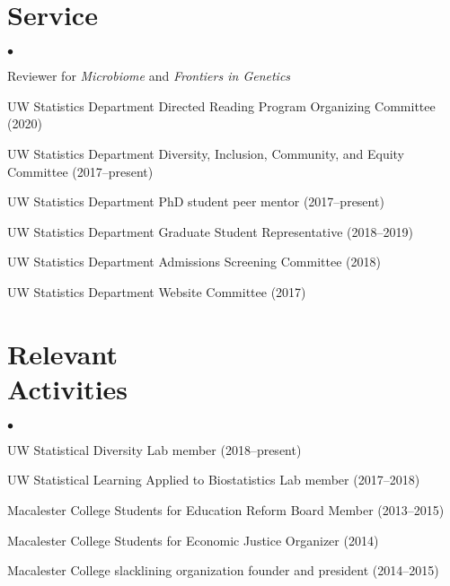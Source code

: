 \documentclass[margin,centered]{res}
\newenvironment{list1}{
  \begin{list}{\ding{113}}{%
      \setlength{\itemsep}{0in}
      \setlength{\parsep}{0in} \setlength{\parskip}{0in}
      \setlength{\topsep}{0in} \setlength{\partopsep}{0in}
      \setlength{\leftmargin}{0.17in}}}{\end{list}}
\newenvironment{list2}{
  \begin{list}{$\bullet$}{%
      \setlength{\itemsep}{0in}
      \setlength{\parsep}{0in} \setlength{\parskip}{0in}
      \setlength{\topsep}{0in} \setlength{\partopsep}{0in}
      \setlength{\leftmargin}{0.2in}}}{\end{list}}
\begin{document}
\begin{resume}
\section{\sc Service}

\begin{list1}
\item[]
\begin{list2}
\vspace*{.05in}
\item Reviewer for \textit{Microbiome} and \textit{Frontiers in Genetics}
\item UW Statistics Department Directed Reading Program Organizing Committee (2020)
\item UW Statistics Department Diversity, Inclusion, Community, and Equity Committee (2017--present)
\item UW Statistics Department PhD student peer mentor (2017--present)
\item UW Statistics Department Graduate Student Representative (2018--2019)
\item UW Statistics Department Admissions Screening Committee (2018)
\item UW Statistics Department Website Committee (2017)
\end{list2}
\end{list1}

\section{\sc Relevant \\ Activities}


\begin{list1}
\item[]
\begin{list2}
\vspace*{.05in}
\item UW Statistical Diversity Lab member (2018--present)
\item UW Statistical Learning Applied to Biostatistics Lab member (2017--2018)
\item Macalester College Students for Education Reform Board Member (2013--2015)
\item Macalester College Students for Economic Justice Organizer (2014)
\item Macalester College slacklining organization founder and president (2014--2015)
\end{list2}
\end{list1}



%
\thispagestyle{lastpage}
\end{resume}
\end{document}
